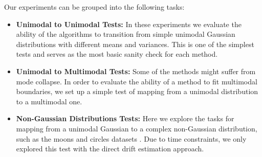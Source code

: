 \documentclass[a4paper,12pt,twoside,openright]{report}
\theoremstyle{definition}
\begin{document}
Our experiments can be grouped into the following tasks:
\begin{itemize}
    \item \textbf{Unimodal to Unimodal Tests:} In these experiments we evaluate the ability of the algorithms to transition from simple unimodal Gaussian distributions with different means and variances. This is one of the simplest tests and serves as the most basic sanity check for each method.
    \item \textbf{Unimodal to Multimodal Tests:} Some of the methods might suffer from mode collapse. In order to evaluate the ability of a method to fit multimodal boundaries, we set up a simple test of mapping from a unimodal distribution to a multimodal one. 
    \item \textbf{Non-Gaussian Distributions Tests:} Here we explore the tasks for mapping from a unimodal Gaussian to a complex non-Gaussian distribution, such as the moons and circles datasets \cite{pedregosa2011scikit}. Due to time constraints, we only explored this test with the direct drift estimation approach.
\end{itemize}
\end{document}
